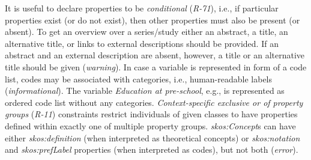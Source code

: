 \documentclass{llncs}
\newenvironment{DL}{
  \small
  \vspace{0cm}
	\begin{center}
  \begin{tabular}{c l}

}{
  \end{tabular}
	\end{center}
}
\begin{document}
It is useful to declare properties to be \emph{conditional} (\emph{R-71}), i.e., if particular properties exist (or do not exist), then other properties must also be present (or absent).
To get an overview over a series/study either an abstract, a title, an alternative title, or links to external descriptions should be provided. 
If an abstract and an external description are absent, however,  
a title or an alternative title should be given (\emph{warning}).
In case a variable is represented in form of a code list, codes may be associated with categories, i.e., human-readable labels (\emph{informational}).
The variable \emph{Education at pre-school}, e.g., is represented as ordered code list without any categories.
\emph{Context-specific exclusive or of property groups} (\emph{R-11}) constraints
restrict individuals of given classes to have properties defined within exactly one of multiple property groups.
\emph{skos:Concept}s can have either \emph{skos:definition} (when interpreted as theoretical concepts) or \emph{skos:notation} and \emph{skos:prefLabel} properties (when interpreted as codes), but not both (\emph{error}).



%
%
\end{document}
